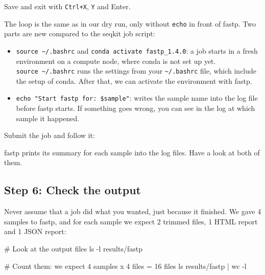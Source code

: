 \documentclass[
  letterpaper,
  DIV=11,
  numbers=noendperiod]{scrreprt}
\newenvironment{Shaded}{}{}
\newcommand{\AttributeTok}[1]{\textcolor[rgb]{0.84,0.23,0.29}{#1}}
\newcommand{\CommentTok}[1]{\textcolor[rgb]{0.42,0.45,0.49}{#1}}
\newcommand{\ExtensionTok}[1]{\textcolor[rgb]{0.84,0.23,0.29}{\textbf{#1}}}
\newcommand{\FunctionTok}[1]{\textcolor[rgb]{0.44,0.26,0.76}{#1}}
\newcommand{\KeywordTok}[1]{\textcolor[rgb]{0.84,0.23,0.29}{#1}}
\newcommand{\NormalTok}[1]{\textcolor[rgb]{0.14,0.16,0.18}{#1}}
\newcommand{\PreprocessorTok}[1]{\textcolor[rgb]{0.84,0.23,0.29}{#1}}
\newcommand{\VariableTok}[1]{\textcolor[rgb]{0.89,0.38,0.04}{#1}}
\providecommand{\tightlist}{%
  \setlength{\itemsep}{0pt}\setlength{\parskip}{0pt}}
\begin{document}
Save and exit with \texttt{Ctrl+X}, \texttt{Y} and Enter.

The loop is the same as in our dry run, only without \texttt{echo} in
front of fastp. Two parts are new compared to the seqkit job script:

\begin{itemize}
\tightlist
\item
  \texttt{source\ \textasciitilde{}/.bashrc} and
  \texttt{conda\ activate\ fastp\_1.4.0}: a job starts in a fresh
  environment on a compute node, where conda is not set up yet.
  \texttt{source\ \textasciitilde{}/.bashrc} runs the settings from your
  \texttt{\textasciitilde{}/.bashrc} file, which include the setup of
  conda. After that, we can activate the environment with fastp.
\item
  \texttt{echo\ "Start\ fastp\ for:\ \$sample"}: writes the sample name
  into the log file before fastp starts. If something goes wrong, you
  can see in the log at which sample it happened.
\end{itemize}

Submit the job and follow it:

\begin{Shaded}
\end{Shaded}

fastp prints its summary for each sample into the log files. Have a look
at both of them.

\subsection{Step 6: Check the output}\label{step-6-check-the-output}

Never assume that a job did what you wanted, just because it finished.
We gave 4 samples to fastp, and for each sample we expect 2 trimmed
files, 1 HTML report and 1 JSON report:

\begin{Shaded}
\begin{Highlighting}[]
\CommentTok{\# Look at the output files}
\FunctionTok{ls} \AttributeTok{{-}l}\NormalTok{ results/fastp}

\CommentTok{\# Count them: we expect 4 samples x 4 files = 16 files}
\FunctionTok{ls}\NormalTok{ results/fastp }\KeywordTok{|} \FunctionTok{wc} \AttributeTok{{-}l}
\end{Highlighting}
\end{Shaded}
\end{document}
